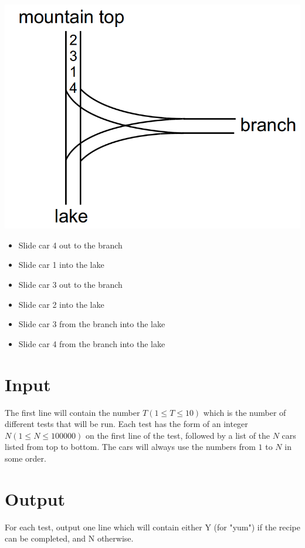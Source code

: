 \begin{minipage}{0.45\linewidth}
  \includegraphics[width=\linewidth]{confection2}
\end{minipage}
\hspace{0.05\linewidth}
\begin{minipage}{0.45\linewidth}
 \begin{itemize}
    \item Slide car 4 out to the branch
    \item Slide car 1 into the lake
    \item Slide car 3 out to the branch
    \item Slide car 2 into the lake
    \item Slide car 3 from the branch into the lake
    \item Slide car 4 from the branch into the lake
  \end{itemize}  
\end{minipage}

\section*{Input}
The first line will contain the number $T (1 \leq T \leq 10)$ which is the number of different tests that will be run. Each test has the form of an integer $N (1 \leq N \leq 100000)$ on the first line of the test, followed by a list of the $N$ cars listed from top to bottom. The cars will always use the numbers from $1$ to $N$ in some order. 

\section*{Output}
For each test, output one line which will contain either Y (for "yum") if the recipe can be completed, and N otherwise.
